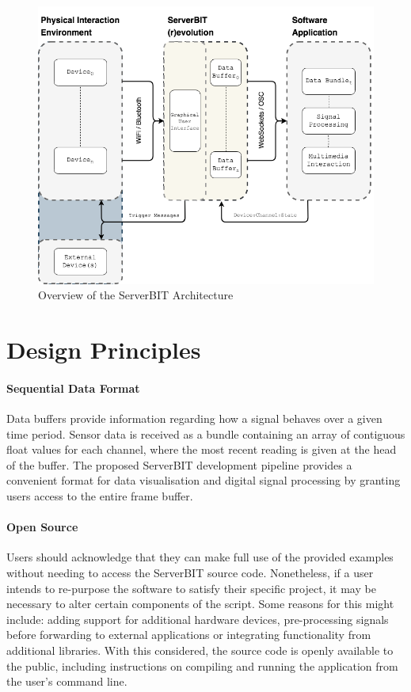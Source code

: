 \begin{figure}[ht]
  \centering
    \includegraphics[width=\textwidth]{Chapters/Figures/technical/ServerBIT/ServerBIT_Archietecture_EXT.png}
    \caption{Overview of the ServerBIT Architecture}
    \label{fig:diagram1}
\end{figure}

\section{Design Principles}

\paragraph{Sequential Data Format}
Data buffers provide information regarding how a signal behaves over a given time period. Sensor data is received as a bundle containing an array of contiguous float values for each channel, where the most recent reading is given at the head of the buffer. The proposed ServerBIT development pipeline provides a convenient format for data visualisation and digital signal processing by granting users access to the entire frame buffer.

\paragraph{Open Source}
Users should acknowledge that they can make full use of the provided examples without needing to access the ServerBIT source code. Nonetheless, if a user intends to re-purpose the software to satisfy their specific project, it may be necessary to alter certain components of the script. Some reasons for this might include: adding support for additional hardware devices, pre-processing signals before forwarding to external applications or integrating functionality from additional libraries. With this considered, the source code is openly available to the public, including instructions on compiling and running the application from the user's command line.

